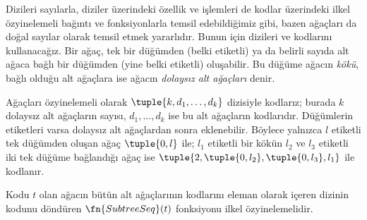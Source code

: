 


Dizileri sayılarla, diziler üzerindeki özellik ve işlemleri de kodlar
üzerindeki ilkel özyinelemeli bağıntı ve fonksiyonlarla temsil edebildiğimiz
gibi, bazen ağaçları da doğal sayılar olarak temsil etmek yararlıdır. Bunun
için dizileri ve kodlarını kullanacağız. Bir ağaç, tek bir düğümden (belki
etiketli) ya da belirli sayıda alt ağaca bağlı bir düğümden (yine belki
etiketli) oluşabilir. Bu düğüme ağacın \emph{kökü}, bağlı olduğu alt ağaçlara
ise ağacın \emph{dolaysız alt ağaçları} denir.

Ağaçları özyinelemeli olarak $\tuple{k,d_1,\dots,d_k}$ dizisiyle kodlarız;
burada $k$ dolaysız alt ağaçların sayısı, $d_1,\dots,d_k$ ise bu alt ağaçların
kodlarıdır. Düğümlerin etiketleri varsa dolaysız alt ağaçlardan sonra
eklenebilir. Böylece yalnızca $l$ etiketli tek düğümden oluşan ağaç
$\tuple{0,l}$ ile; $l_1$ etiketli bir kökün $l_2$ ve $l_3$ etiketli iki tek
düğüme bağlandığı ağaç ise
$\tuple{2,\tuple{0,l_2},\tuple{0,l_3},l_1}$ ile kodlanır.

\begin{prop}
  Kodu $t$ olan ağacın bütün alt ağaçlarının kodlarını eleman olarak içeren
  dizinin kodunu döndüren $\fn{SubtreeSeq}(t)$ fonksiyonu ilkel
  özyinelemelidir.
\end{prop}

